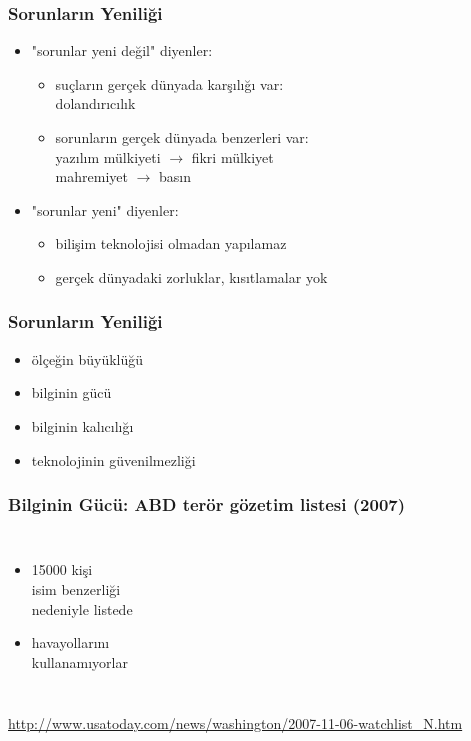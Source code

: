 \documentclass[dvipsnames]{beamer}
\theoremstyle{definition}
\theoremstyle{example}
\theoremstyle{plain}
\begin{document}
\begin{frame}
  \frametitle{Sorunların Yeniliği}

  \begin{itemize}
    \item "sorunlar yeni değil" diyenler:
    \begin{itemize}
      \item suçların gerçek dünyada karşılığı var:\\
        dolandırıcılık
      \item sorunların gerçek dünyada benzerleri var:\\
        yazılım mülkiyeti $\rightarrow$ fikri mülkiyet\\
        mahremiyet $\rightarrow$ basın
    \end{itemize}

    \pause
    \medskip
    \item "sorunlar yeni" diyenler:
    \begin{itemize}
      \item bilişim teknolojisi olmadan yapılamaz
      \item gerçek dünyadaki zorluklar, kısıtlamalar yok
    \end{itemize}
  \end{itemize}
\end{frame}

\begin{frame}
  \frametitle{Sorunların Yeniliği}

  \begin{itemize}
    \item ölçeğin büyüklüğü
    \item bilginin gücü
    \item bilginin kalıcılığı
    \item teknolojinin güvenilmezliği
  \end{itemize}
\end{frame}

\begin{frame}
  \frametitle{Bilginin Gücü: ABD terör gözetim listesi (2007)}

  \begin{columns}

    \begin{itemize}
      \item 15000 kişi\\
        isim benzerliği\\
        nedeniyle listede
      \item havayollarını\\
        kullanamıyorlar
    \end{itemize}
  \end{columns}

  \medskip
  \tiny{\url{http://www.usatoday.com/news/washington/2007-11-06-watchlist_N.htm}}
\end{frame}
\end{document}
